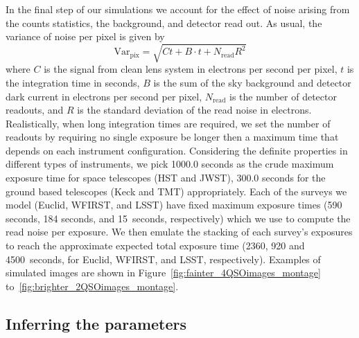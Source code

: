\documentclass[a4paper,11pt]{article}
\begin{document}
In the final step of our simulations we account for the effect of
noise arising from the counts statistics, the background, and detector
read out. As usual, the variance of noise per pixel is given by
%
\begin{equation}
   \label{eq:noise}
   \mathrm{Var}_{\mathrm{pix}} = \sqrt{Ct+B\cdot t + N_{\mathrm{read}} R^{2}}
\end{equation}
%
where $C$ is the signal from clean lens system in electrons per second
per pixel, $t$ is the integration time in seconds, $B$
is the sum of the sky background and detector dark current in
electrons per second per pixel, $N_{\mathrm{read}}$ is the number of
detector readouts, and $R$ is the standard deviation of the read noise
in electrons. Realistically, when long integration times are required,
we set the number of readouts by requiring no single exposure be
longer then a maximum time that depends on each instrument
configuration.
Considering the definite properties in different types of instruments,
we pick 1000.0 seconds as the crude maximum exposure time for space
telescopes (HST and JWST), 300.0 seconds for the ground based
telescopes (Keck and TMT) appropriately. Each of the surveys we
model  (Euclid, WFIRST, and LSST) have fixed maximum exposure times
(590 seconds, 184 seconds, and 15~seconds, respectively) which
we use to compute the read noise per exposure. We then emulate  the
stacking of each survey's exposures to reach the approximate expected
total exposure time (2360, 920 and 4500~seconds, for Euclid, WFIRST,
and LSST, respectively).
Examples of simulated images are shown in
Figure~\ref{fig:fainter_4QSOimages_montage}
to~\ref{fig:brighter_2QSOimages_montage}.

\subsection{Inferring the parameters}
\label{ssec:inf}
\end{document}
